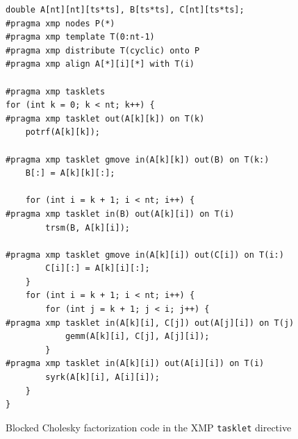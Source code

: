 ﻿\documentclass[graybox]{svmult}
\begin{document}
\begin{figure}[t]
\centering
{\scriptsize
\begin{minipage}{7.8cm}
\begin{lstlisting}
double A[nt][nt][ts*ts], B[ts*ts], C[nt][ts*ts];
#pragma xmp nodes P(*)
#pragma xmp template T(0:nt-1)
#pragma xmp distribute T(cyclic) onto P
#pragma xmp align A[*][i][*] with T(i)

#pragma xmp tasklets
for (int k = 0; k < nt; k++) {
#pragma xmp tasklet out(A[k][k]) on T(k)
    potrf(A[k][k]);

#pragma xmp tasklet gmove in(A[k][k]) out(B) on T(k:)
    B[:] = A[k][k][:];

    for (int i = k + 1; i < nt; i++) {
#pragma xmp tasklet in(B) out(A[k][i]) on T(i)
        trsm(B, A[k][i]);

#pragma xmp tasklet gmove in(A[k][i]) out(C[i]) on T(i:)
        C[i][:] = A[k][i][:];            
    }
    for (int i = k + 1; i < nt; i++) {
        for (int j = k + 1; j < i; j++) {
#pragma xmp tasklet in(A[k][i], C[j]) out(A[j][i]) on T(j)
            gemm(A[k][i], C[j], A[j][i]);
        }
#pragma xmp tasklet in(A[k][i]) out(A[i][i]) on T(i)
        syrk(A[k][i], A[i][i]);
    }
}
\end{lstlisting}
\end{minipage}
}
\caption{Blocked Cholesky factorization code in the XMP {\tt tasklet} directive}
\label{FIG_CHOLESKY}
\end{figure}
\end{document}
